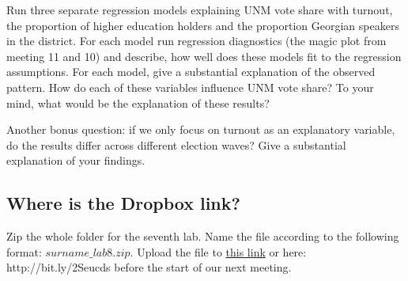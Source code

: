 \documentclass{article}\usepackage[]{graphicx}\usepackage[]{color}
\begin{document}
Run three separate regression models explaining UNM vote share with turnout, the proportion of higher education holders and the proportion Georgian speakers in the district. For each model run regression diagnostics (the magic plot from meeting 11 and 10) and describe, how well does these models fit to the regression assumptions. For each model, give a substantial explanation of the observed pattern. How do each of these variables influence UNM vote share? To your mind, what would be the explanation of these results?

Another bonus question: if we only focus on turnout as an explanatory variable, do the results differ across different election waves? Give a substantial explanation of your findings.


\subsection*{Where is the Dropbox link?}

Zip the whole folder for the seventh lab. Name the file according to the following format: $surname\_lab8.zip$. Upload the file to \href{https://www.dropbox.com/request/nfTibH7VznLYZkP6La8S}{this link} or here: http://bit.ly/2Seucds before the start of our next meeting.
\end{document}
